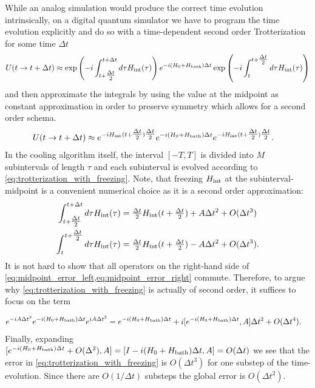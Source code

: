 \documentclass[12pt,a4paper]{article}
\newcommand{\SA}[1]{{\color{orange}{[SA: #1]}}}
\begin{document}
While an analog simulation would produce the correct time evolution intrinsically, on a digital quantum simulator we have to program the time evolution explicitly and do so with a time-dependent second order Trotterization for some time $\Delta t$
\begin{align}\label{eq:trotterization}\notag
U(t\rightarrow t+\Delta t)&\approx \exp\left(-i\int_{t+\tfrac{\Delta t}{2}}^{t+\Delta t}d\tau H_{\rm int}(\tau)\right)e^{-i(H_0+H_{\rm bath})\Delta t} \exp\left(-i\int_{t}^{t+\tfrac{\Delta t}{2}}d\tau H_{\rm int}(\tau)\right)\\
\end{align}
and then approximate the integrals by using the value at the midpoint as constant approximation in order to preserve symmetry which allows for a second order schema.
\begin{align}\label{eq:trotterization_with_freezing}
U(t\rightarrow t+\Delta t)&\approx e^{-i H_{\rm int}(t+\tfrac{\Delta t}{2})\tfrac{\Delta t}{2}}e^{-i(H_0+H_{\rm bath})\Delta t} e^{-i H_{\rm int}(t+\tfrac{\Delta t}{2})\tfrac{\Delta t}{2}}.
\end{align}
In the cooling algorithm itself, the interval $[-T,T]$ is divided into $M$ subintervals of length $\tau$ and each subinterval is evolved according to \cref{eq:trotterization_with_freezing}. Note, that freezing $H_{\rm int}$ at the subinterval-midpoint is a convenient numerical choice as it is a second order approximation:
\begin{align}\label{eq:midpoint_error_right}
    \int_{t+\tfrac{\Delta t}{2}}^{t+\Delta t}d\tau H_{\rm int}(\tau) & = \tfrac{\Delta t}{2} H_{\rm int}(t+\tfrac{\Delta t}{2})+ A \Delta t^2 + O( \Delta t^3)\\ \label{eq:midpoint_error_left}
    \int_t^{t+\tfrac{\Delta t}{2}}d\tau H_{\rm int}(\tau) & = \tfrac{\Delta t}{2} H_{\rm int}(t+\tfrac{\Delta t}{2})- A \Delta t^2 + O( \Delta t^3).
\end{align} It is not hard to show that all operators on the right-hand side of \cref{eq:midpoint_error_left,eq:midpoint_error_right} commute. Therefore, to argue why \cref{eq:trotterization_with_freezing} is actually of second order, it suffices to focus on the term 

\begin{align}
e^{-iA\Delta t^2}    e^{-i(H_0+H_{\rm bath})\Delta t} e^{iA\Delta t^2} &=   e^{-i(H_0+H_{\rm bath})\Delta t} + i [e^{-i(H_0+H_{\rm bath})\Delta t},A] \Delta t^2 + O(\Delta t^4).
\end{align} Finally, expanding $
 [e^{-i(H_0+H_{\rm bath})\Delta t} + O(\Delta^2),A] = [I-i(H_0+H_{\rm bath})\Delta t, A]  =O(\Delta t)$ we see that the error in \cref{eq:trotterization_with_freezing} is $O(\Delta t^3)$ for one substep of the time-evolution. Since there are $O(1/\Delta t)$ substeps the global error is $O(\Delta t^2)$.
\end{document}
